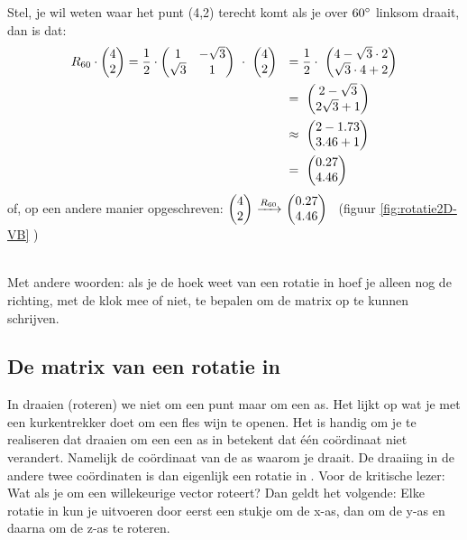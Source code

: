 Stel, je wil weten waar het punt (4,2) terecht komt als je over  $ 60 \degree$ linksom draait, dan is dat:
\begin{align*}
R_{60} \cdot  \mattwee{4}{2} 
=\frac{1}{2} \cdot  \mattwee{1 & -\sqrt{3} }{\sqrt{3} & 1} \ \cdot  \  \mattwee{4}{2}  \ \ 
& = \frac{1}{2}\cdot \  \mattwee{4  - \sqrt{3}\cdot 2 }    { \sqrt{3}\cdot 4 + 2} \\ 
& = \  \mattwee{2-\sqrt{3}}{2\sqrt{3}+1} \\ 
& \approx \  \mattwee{2-1.73}{3.46+1}  \\ 
&= \  \mattwee{0.27}{4.46}  
\end{align*}
of, op een andere manier opgeschreven: 
$ \vectwee{4}{2}   \  \xrightarrow{R_{60}}  \ \vectwee{0.27}{4.46} $ \ (figuur \ref{fig:rotatie2D-VB}  )


\\
Met andere woorden: als je de hoek weet van een rotatie in \RT hoef je alleen nog de richting, met de klok mee of niet,  te bepalen om de matrix op te kunnen schrijven.

\subsection{De matrix van een rotatie in \RD}
In \RD draaien (roteren) we niet om een punt maar om een as. Het lijkt op wat je met een kurkentrekker doet om een fles wijn te openen. Het is handig om je te realiseren dat draaien om een een as in \RD betekent dat één coördinaat niet verandert. Namelijk de coördinaat van de as waarom je draait.  De draaiing in de andere twee coördinaten is dan eigenlijk een rotatie in \RT. Voor de kritische lezer: Wat als je om een willekeurige vector roteert? Dan geldt het volgende: Elke rotatie in \RD kun je uitvoeren door eerst een stukje om de x-as, dan om de y-as en daarna om de z-as te roteren.


